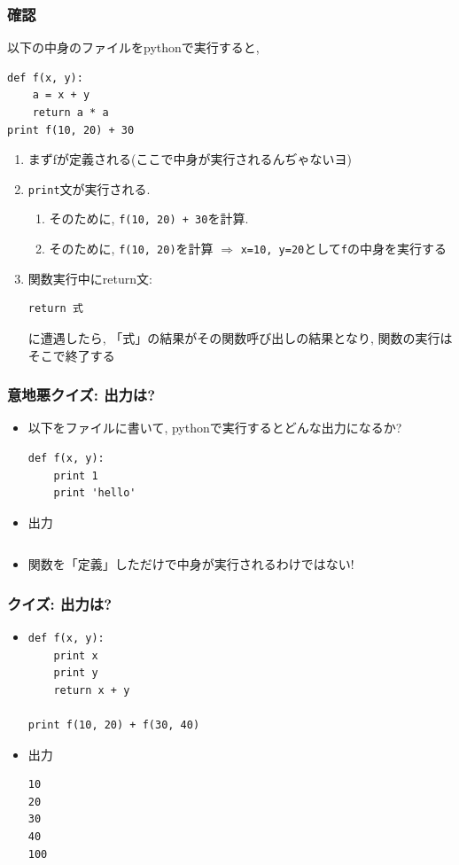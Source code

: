 \documentclass[10pt,dvipdfmx]{beamer}
\newcommand{\ao}[1]{{\color{blue}#1}}
\newcommand{\aka}[1]{{\color{red}#1}}
\begin{document}
\begin{frame}[fragile]
\frametitle{確認}
以下の中身のファイルをpythonで実行すると,
\begin{lstlisting}
def f(x, y):
    a = x + y
    return a * a
print f(10, 20) + 30
\end{lstlisting}
  
\begin{enumerate}
\item まずfが\ao{定義}される\aka{(ここで中身が実行されるんぢゃないヨ)}
\item {\tt print}文が実行される. 
  \begin{enumerate}
  \item そのために, {\tt f(10, 20) + 30}を計算. 
  \item そのために, {\tt f(10, 20)}を計算 
    $\Rightarrow$ {\tt x=10, y=20}として{\tt f}の中身を実行する
  \end{enumerate}

\item 関数実行中にreturn文:
\begin{lstlisting}
return 式    
\end{lstlisting}
に遭遇したら, 「式」の結果がその関数呼び出しの結果となり,
関数の実行はそこで終了する
\end{enumerate}
\end{frame}

\begin{frame}[fragile]
\frametitle{{\tiny 意地悪}クイズ: 出力は?}
\begin{itemize}
\item 以下をファイルに書いて, pythonで実行するとどんな出力になるか?
\begin{lstlisting}
def f(x, y):
    print 1
    print 'hello'
\end{lstlisting}

\item<2> 出力
\begin{lstlisting}
\end{lstlisting}

\item<2> 関数を「定義」しただけで中身が実行されるわけではない!
\end{itemize}
\end{frame}


\begin{frame}[fragile]
\frametitle{クイズ: 出力は?}
\begin{itemize}
\item 
\begin{lstlisting}
def f(x, y):
    print x
    print y
    return x + y

print f(10, 20) + f(30, 40)
\end{lstlisting}

\item<2-> 出力
\begin{lstlisting}
10
20
30
40
100
\end{lstlisting}

\end{itemize}
\end{frame}
\end{document}
